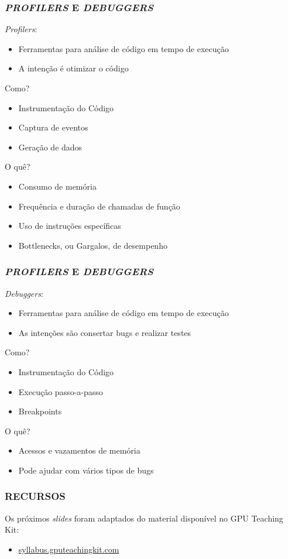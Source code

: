 \documentclass[10pt, compress]{beamer}
\begin{document}
\begin{frame}
    \frametitle{\textit{PROFILERS} E \textit{DEBUGGERS}}
    \textit{Profilers}:
    \begin{itemize}
        \item Ferramentas para análise de código \alert{em tempo de execução}
        \item A intenção é \alert{otimizar o código}
    \end{itemize}
    \pause
    Como?
    \begin{itemize}
        \item Instrumentação do Código
        \item Captura de eventos
        \item Geração de dados
    \end{itemize}
    \pause
    O quê?
    \begin{itemize}
        \item Consumo de memória
        \item Frequência e duração de chamadas de função
        \item Uso de instruções específicas
        \pause
        \item \alert{Bottlenecks}, ou \alert{Gargalos}, de desempenho
    \end{itemize}
\end{frame}

\begin{frame}
    \frametitle{\textit{PROFILERS} E \textit{DEBUGGERS}}
    \textit{Debuggers}:
    \begin{itemize}
        \item Ferramentas para análise de código \alert{em tempo de execução}
        \item As intenções são \alert{consertar bugs} e realizar \alert{testes}
    \end{itemize}
    \pause
    Como?
    \begin{itemize}
        \item Instrumentação do Código
        \item Execução passo-a-passo
        \item \alert{Breakpoints}
    \end{itemize}
    \pause
    O quê?
    \begin{itemize}
        \item Acessos e vazamentos de memória
        \pause
        \item Pode ajudar com vários tipos de \alert{bugs} \smiley{}
    \end{itemize}
\end{frame}

\begin{frame}
    \frametitle{RECURSOS}
    Os próximos \emph{slides} foram adaptados do
    material disponível no \alert{GPU Teaching Kit}:
    \begin{itemize}
        \item \url{syllabus.gputeachingkit.com}
    \end{itemize}
\end{frame}


\maketitle
\end{document}
